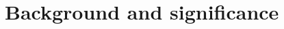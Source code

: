 \documentclass[11pt]{article}
\begin{document}







\section{Background and significance}
\end{document}
